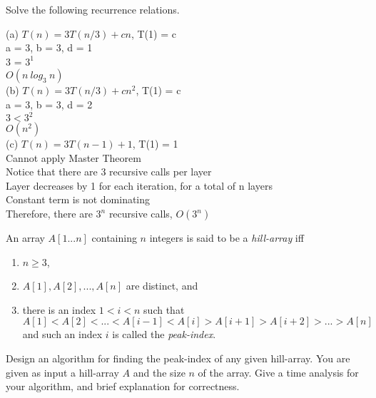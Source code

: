 \documentclass[answers]{exam}
\begin{document}
\begin{questions}
 
 
\question[15]

Solve the following recurrence relations.

(a) $T(n) = 3 T(n/3) + cn$,    T(1) = c\\

a = 3, b = 3, d = 1\\
3 = $3^1$\\
$O(n\:log_3\:n)$\\

(b) $T(n) = 3 T(n/3) + cn^{2}$,  T(1) = c\\

a = 3, b = 3, d = 2\\
$3 < 3^2$\\
$O(n^2)$\\

(c) $T(n) = 3 T(n-1) + 1$, T(1) = 1\\

Cannot apply Master Theorem\\
Notice that there are 3 recursive calls per layer\\
Layer decreases by 1 for each iteration, for a total of n layers\\
Constant term is not dominating\\
Therefore, there are $3^n$ recursive calls, $O(3^n)$\\



\vspace{0.2in}



\question[15] An array $A[1...n]$ containing $n$ integers is said to be a {\em hill-array} iff
\begin{enumerate}
\item $n \geq 3$,
\item $A[1], A[2], ..., A[n]$ are distinct, and
\item there is an index $1 < i < n$ such that $$A[1] < A[2] < ... < A[i-1] < A[i] > A[i+1] > A[i+2] > ... > A[n]$$ and such an index $i$ is called the {\em peak-index}.
\end{enumerate}

Design an algorithm for finding the peak-index of any given hill-array.
You are given as input a hill-array $A$ and the size $n$ of the array.
Give a time analysis for your algorithm, and brief explanation for correctness. 


\end{questions}
\end{document}
